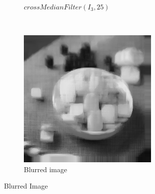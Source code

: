 \documentclass{article}
\begin{document}
\begin{figure}[!htb]
\begin{subfigure}[b]{0.3\textwidth}
        \caption{$crossMedianFilter(I_3, 25)$}
    \end{subfigure}
    ~
    \begin{subfigure}[b]{0.3\textwidth}
        \includegraphics[width=\textwidth]{img/Dilated2.png}
        \caption{Blurred image}
    \end{subfigure}

    \caption{Blurred Image}
\end{figure}
\end{document}
